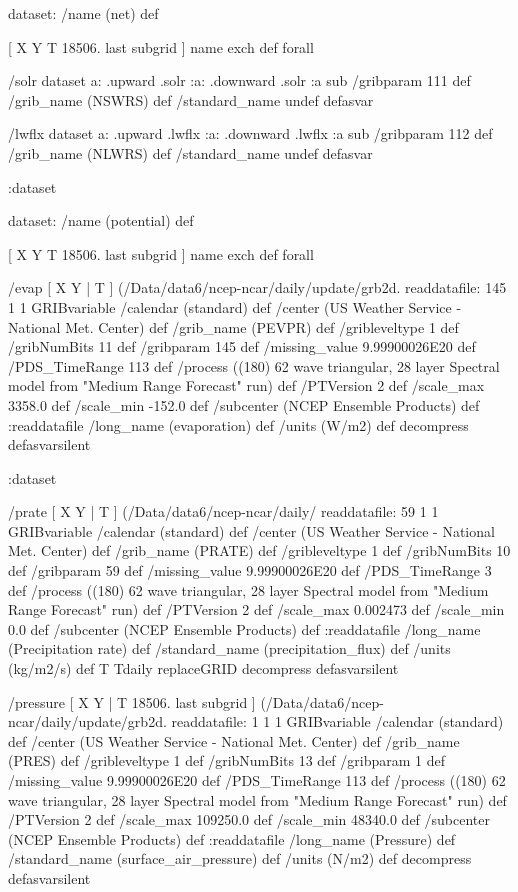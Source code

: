 \begin{ingrid}
  dataset: /name (net) def

   [ X Y T 18506. last subgrid ] { name exch def } forall
 
   /solr
   { dataset
   a: .upward .solr
   :a: .downward .solr
   :a
   sub
   /gribparam 111 def
   /grib_name (NSWRS) def
   /standard_name undef
   } defasvar

   /lwflx
   { dataset
   a: .upward .lwflx
   :a: .downward .lwflx
   :a
   sub
   /gribparam 112 def
   /grib_name (NLWRS) def
   /standard_name undef
   } defasvar  

  :dataset

  dataset: /name (potential) def

   [ X Y T 18506. last subgrid ] { name exch def } forall

    /evap { [ X Y | T ] (/Data/data6/ncep-ncar/daily/update/grb2d.%
    readdatafile:
    145 1 1 GRIBvariable
    /calendar (standard) def
    /center (US Weather Service - National Met. Center) def
    /grib_name (PEVPR) def
    /gribleveltype 1 def
    /gribNumBits 11 def
    /gribparam 145 def
    /missing_value 9.99900026E20 def 
    /PDS_TimeRange 113 def
    /process ((180) 62 wave triangular, 28 layer Spectral model from "Medium Range Forecast" run) def
    /PTVersion 2 def
    /scale_max 3358.0 def
    /scale_min -152.0 def
    /subcenter (NCEP Ensemble Products) def
    :readdatafile
    /long_name (evaporation) def
    /units (W/m2) def
    decompress
    } defasvarsilent

  :dataset

  /prate { [ X Y | T ] (/Data/data6/ncep-ncar/daily/%
  readdatafile:
  59 1 1 GRIBvariable
  /calendar (standard) def
  /center (US Weather Service - National Met. Center) def
  /grib_name (PRATE) def
  /gribleveltype 1 def
  /gribNumBits 10 def
  /gribparam 59 def
  /missing_value 9.99900026E20 def 
  /PDS_TimeRange 3 def
  /process ((180) 62 wave triangular, 28 layer Spectral model from "Medium Range Forecast" run) def
  /PTVersion 2 def
  /scale_max 0.002473 def
  /scale_min 0.0 def
  /subcenter (NCEP Ensemble Products) def
  :readdatafile
  /long_name (Precipitation rate) def
  /standard_name (precipitation_flux) def
  /units (kg/m2/s) def
  T Tdaily replaceGRID 
  decompress
  } defasvarsilent
  
  /pressure { [ X Y | T 18506. last subgrid ] (/Data/data6/ncep-ncar/daily/update/grb2d.%
  readdatafile:
  1 1 1 GRIBvariable
  /calendar (standard) def
  /center (US Weather Service - National Met. Center) def
  /grib_name (PRES) def
  /gribleveltype 1 def
  /gribNumBits 13 def
  /gribparam 1 def
  /missing_value 9.99900026E20 def 
  /PDS_TimeRange 113 def
  /process ((180) 62 wave triangular, 28 layer Spectral model from "Medium Range Forecast" run) def
  /PTVersion 2 def
  /scale_max 109250.0 def
  /scale_min 48340.0 def
  /subcenter (NCEP Ensemble Products) def
  :readdatafile
  /long_name (Pressure) def
  /standard_name (surface_air_pressure) def
  /units (N/m2) def
  decompress
  } defasvarsilent


\end{ingrid}
